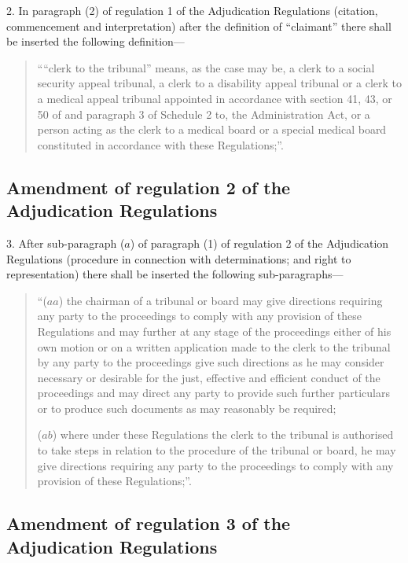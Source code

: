 \documentclass[a4paper]{article}
\begin{document}
2.  In paragraph (2) of regulation 1 of the Adjudication Regulations (citation, commencement and interpretation) after the definition of “claimant” there shall be inserted the following definition—
\begin{quotation}
““clerk to the tribunal” means, as the case may be, a clerk to a social security appeal tribunal, a clerk to a disability appeal tribunal or a clerk to a medical appeal tribunal appointed in accordance with section 41, 43, or 50 of and paragraph 3 of Schedule 2 to, the Administration Act, or a person acting as the clerk to a medical board or a special medical board constituted in accordance with these Regulations;”.
\end{quotation}

\subsection[3. Amendment of regulation 2 of the Adjudication Regulations]{Amendment of regulation 2 of the Adjudication Regulations}

3.  After sub-paragraph ($a$) of paragraph (1) of regulation 2 of the Adjudication Regulations (procedure in connection with determinations; and right to representation) there shall be inserted the following sub-paragraphs—
\begin{quotation}
“($aa$) the chairman of a tribunal or board may give directions requiring any party to the proceedings to comply with any provision of these Regulations and may further at any stage of the proceedings either of his own motion or on a written application made to the clerk to the tribunal by any party to the proceedings give such directions as he may consider necessary or desirable for the just, effective and efficient conduct of the proceedings and may direct any party to provide such further particulars or to produce such documents as may reasonably be required;

($ab$) where under these Regulations the clerk to the tribunal is authorised to take steps in relation to the procedure of the tribunal or board, he may give directions requiring any party to the proceedings to comply with any provision of these Regulations;”.
\end{quotation}

\subsection[4. Amendment of regulation 3 of the Adjudication Regulations]{Amendment of regulation 3 of the Adjudication Regulations}
\end{document}
